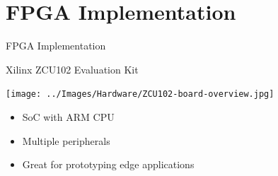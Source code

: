 \setlength{\parskip}{\baselineskip}
\section{FPGA Implementation}

\begin{frame}
    \huge FPGA Implementation
\end{frame}

\begin{frame}{Xilinx ZCU102 Evaluation Kit}
	\begin{minipage}{0.6\textwidth}
    	\centering
    	\texttt{[image: ../Images/Hardware/ZCU102-board-overview.jpg]}\\
	\end{minipage}%
	\begin{minipage}{0.4\textwidth}
		\begin{itemize}
		    \item SoC with ARM CPU
	        \item Multiple peripherals
	        \item Great for prototyping edge applications
		\end{itemize}
	\end{minipage}
\end{frame}



